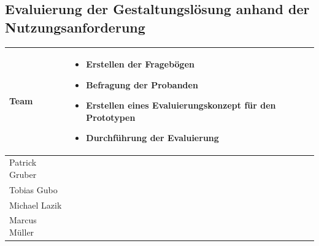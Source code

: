 \documentclass[12pt, a4paper]{scrartcl}
\begin{document}
	\subsection*{Evaluierung der Gestaltungslösung anhand der Nutzungsanforderung}
	\begin{tabularx}{0.95\textwidth}{|l|X|}
		\hline
		Team & \begin{itemize}
			\item Erstellen der Fragebögen
			\item Befragung der Probanden
			\item Erstellen eines Evaluierungskonzept für den Prototypen
			\item Durchführung der Evaluierung 
		\end{itemize}\\
		\hline
		Patrick Gruber & \\
		\hline
		Tobias Gubo & \\
		\hline
		Michael Lazik & \\
		\hline
		Marcus Müller & \\
		\hline
	\end{tabularx}
	
\end{document}
